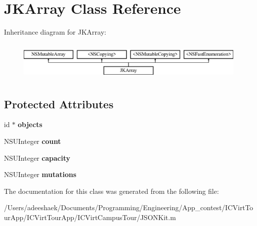 \hypertarget{interface_j_k_array}{\section{J\-K\-Array Class Reference}
\label{interface_j_k_array}
}
Inheritance diagram for J\-K\-Array\-:\begin{figure}[H]
\begin{center}
\leavevmode
\includegraphics[height=1.931034cm]{interface_j_k_array}
\end{center}
\end{figure}
\subsection*{Protected Attributes}
\begin{DoxyCompactItemize}
\item 
\hypertarget{interface_j_k_array_abf9a9ec6265b27d60feca976f918a3a9}{id $\ast$ {\bfseries objects}}\label{interface_j_k_array_abf9a9ec6265b27d60feca976f918a3a9}

\item 
\hypertarget{interface_j_k_array_ac968acbdbe8558802740546df937c12e}{N\-S\-U\-Integer {\bfseries count}}\label{interface_j_k_array_ac968acbdbe8558802740546df937c12e}

\item 
\hypertarget{interface_j_k_array_a0c0489633856e73ce1be1ea4a53e59e5}{N\-S\-U\-Integer {\bfseries capacity}}\label{interface_j_k_array_a0c0489633856e73ce1be1ea4a53e59e5}

\item 
\hypertarget{interface_j_k_array_aad877b0b159760efefe926a6613dcd5e}{N\-S\-U\-Integer {\bfseries mutations}}\label{interface_j_k_array_aad877b0b159760efefe926a6613dcd5e}

\end{DoxyCompactItemize}


The documentation for this class was generated from the following file\-:\begin{DoxyCompactItemize}
\item 
/\-Users/adeeshaek/\-Documents/\-Programming/\-Engineering/\-App\-\_\-contest/\-I\-C\-Virt\-Tour\-App/\-I\-C\-Virt\-Tour\-App/\-I\-C\-Virt\-Campus\-Tour/J\-S\-O\-N\-Kit.\-m\end{DoxyCompactItemize}
